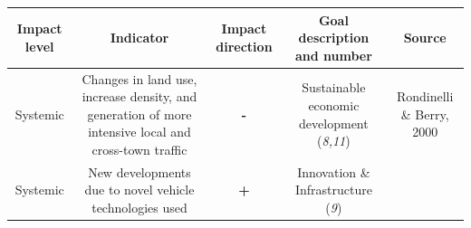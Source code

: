 \documentclass[
]{book}
\begin{document}
\begin{longtable}[]{@{}ccccc@{}}
\toprule
\begin{minipage}[b]{0.17\columnwidth}\centering
Impact level\strut
\end{minipage} & \begin{minipage}[b]{0.16\columnwidth}\centering
Indicator\strut
\end{minipage} & \begin{minipage}[b]{0.17\columnwidth}\centering
Impact direction\strut
\end{minipage} & \begin{minipage}[b]{0.17\columnwidth}\centering
Goal description and number\strut
\end{minipage} & \begin{minipage}[b]{0.17\columnwidth}\centering
Source\strut
\end{minipage}\tabularnewline
\midrule
\endhead
\begin{minipage}[t]{0.17\columnwidth}\centering
Systemic\strut
\end{minipage} & \begin{minipage}[t]{0.16\columnwidth}\centering
Changes in land use, increase density, and generation of more intensive local and cross-town traffic\strut
\end{minipage} & \begin{minipage}[t]{0.17\columnwidth}\centering
\textbf{-}\strut
\end{minipage} & \begin{minipage}[t]{0.17\columnwidth}\centering
Sustainable economic development (\emph{8,11})\strut
\end{minipage} & \begin{minipage}[t]{0.17\columnwidth}\centering
Rondinelli \& Berry, 2000\strut
\end{minipage}\tabularnewline
\begin{minipage}[t]{0.17\columnwidth}\centering
Systemic\strut
\end{minipage} & \begin{minipage}[t]{0.16\columnwidth}\centering
New developments due to novel vehicle technologies used\strut
\end{minipage} & \begin{minipage}[t]{0.17\columnwidth}\centering
\textbf{+}\strut
\end{minipage} & \begin{minipage}[t]{0.17\columnwidth}\centering
Innovation \& Infrastructure (\emph{9})\strut
\end{minipage} & \begin{minipage}[t]{0.17\columnwidth}\centering

\end{minipage}
\end{longtable}
\end{document}
